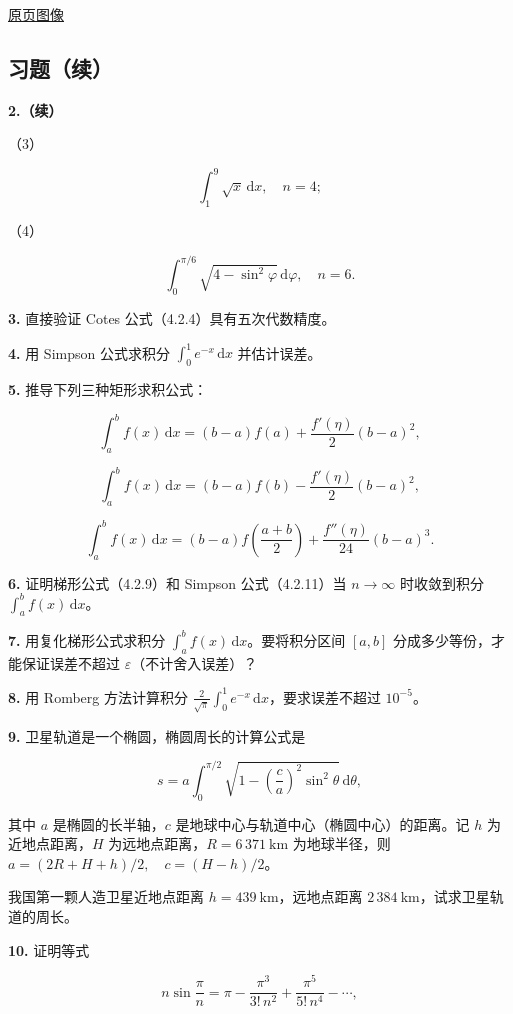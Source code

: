 \documentclass[
  10pt,
  fontset=fandol]{ctexart}
\begin{document}
\href{../../source-images/pdf-118.jpeg}{原页图像}

\subsection{习题（续）}\label{ux4e60ux9898ux7eed}

\textbf{2.（续）}

（3）

\[
\int_1^9\sqrt{x}\,\mathrm{d}x,\quad n=4;
\]

（4）

\[
\int_0^{\pi/6}\sqrt{4-\sin^2\varphi}\,\mathrm{d}\varphi,\quad n=6.
\]

\textbf{3.} 直接验证 Cotes 公式（4.2.4）具有五次代数精度。

\textbf{4.} 用 Simpson 公式求积分 \(\displaystyle\int_0^1 e^{-x}\,\mathrm{d}x\) 并估计误差。

\textbf{5.} 推导下列三种矩形求积公式：

\[
\int_a^b f(x)\,\mathrm{d}x=(b-a)f(a)+\frac{f'(\eta)}2(b-a)^2,
\]

\[
\int_a^b f(x)\,\mathrm{d}x=(b-a)f(b)-\frac{f'(\eta)}2(b-a)^2,
\]

\[
\int_a^b f(x)\,\mathrm{d}x=(b-a)f\left(\frac{a+b}2\right)+\frac{f''(\eta)}{24}(b-a)^3.
\]

\textbf{6.} 证明梯形公式（4.2.9）和 Simpson 公式（4.2.11）当 \(n\to\infty\) 时收敛到积分 \(\displaystyle\int_a^b f(x)\,\mathrm{d}x\)。

\textbf{7.} 用复化梯形公式求积分 \(\displaystyle\int_a^b f(x)\,\mathrm{d}x\)。要将积分区间 \([a,b]\) 分成多少等份，才能保证误差不超过 \(\varepsilon\)（不计舍入误差）？

\textbf{8.} 用 Romberg 方法计算积分 \(\displaystyle\frac2{\sqrt\pi}\int_0^1 e^{-x}\,\mathrm{d}x\)，要求误差不超过 \(10^{-5}\)。

\textbf{9.} 卫星轨道是一个椭圆，椭圆周长的计算公式是

\[
s=a\int_0^{\pi/2}\sqrt{1-\left(\frac ca\right)^2\sin^2\theta}\,\mathrm{d}\theta,
\]

其中 \(a\) 是椭圆的长半轴，\(c\) 是地球中心与轨道中心（椭圆中心）的距离。记 \(h\) 为近地点距离，\(H\) 为远地点距离，\(R=6\,371\ \mathrm{km}\) 为地球半径，则 \(a=(2R+H+h)/2,\quad c=(H-h)/2\)。

我国第一颗人造卫星近地点距离 \(h=439\ \mathrm{km}\)，远地点距离 \(2\,384\ \mathrm{km}\)，试求卫星轨道的周长。

\textbf{10.} 证明等式

\[
n\sin\frac\pi n=\pi-\frac{\pi^3}{3!\,n^2}+\frac{\pi^5}{5!\,n^4}-\cdots,
\]
\end{document}
